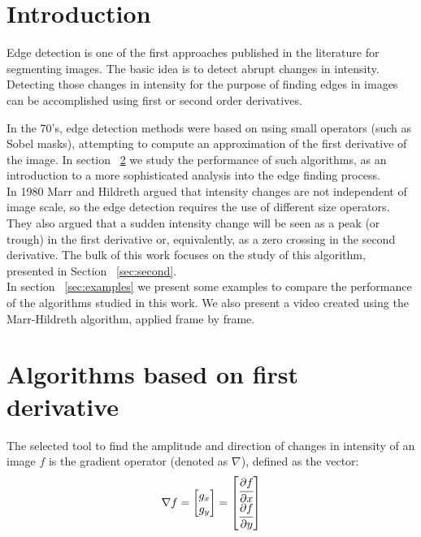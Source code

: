 \documentclass{ipol}
\numberwithin{equation}{section}
\numberwithin{table}{section}
\numberwithin{figure}{section}
\begin{document}
\section{Introduction}
\label{sec:intro}

Edge detection is one of the first approaches published in the literature for 
segmenting images. The basic idea is to detect abrupt changes in intensity. 
Detecting those changes in intensity for the purpose of finding edges in images 
can be accomplished using first or second order derivatives. 

In the 70's, edge detection methods were based on using small operators 
(such as Sobel masks), attempting to compute an approximation of the
first derivative of the image. In section ~\ref{sec:first} we study the 
performance of such algorithms, as an introduction to a more sophisticated 
analysis into the edge finding process.\\

In 1980 Marr and Hildreth argued that intensity changes are not independent 
of image scale, so the edge detection requires the use of different size 
operators. They also argued that a sudden intensity change will be seen 
as a peak (or trough) in the first derivative or, equivalently, as a zero 
crossing in the second derivative. The bulk of this work focuses on the 
study of this algorithm, presented in Section ~\ref{sec:second}.\\

In section ~\ref{sec:examples} we present some examples to compare the 
performance of the algorithms studied in this work. We also present a 
video created using the Marr-Hildreth algorithm, applied frame by frame.\\

\section{Algorithms based on first derivative}
\label{sec:first}

The selected tool to find the amplitude and direction of changes in 
intensity of an image $f$ is the gradient operator (denoted as $\nabla$), defined 
as the vector:
\begin{equation}
	\nabla f = 
				\begin{bmatrix} 
					g_x \\ g_y
				\end{bmatrix}
	=				
				\begin{bmatrix} 
					\cfrac{\partial f}{\partial x} \\ \cfrac{\partial f}{\partial y} \\
				\end{bmatrix}
\end{equation}
\end{document}
